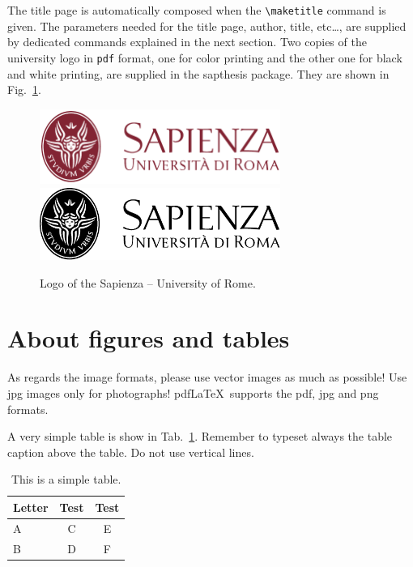 \documentclass[LaM,binding=0.6cm]{sapthesis}
\newcommand{\bs}{\textbackslash}
\begin{document}
The title page is automatically composed when the \texttt{\bs maketitle} command is given.
The parameters needed for the title page, author, title, etc\ldots , are supplied by dedicated commands explained in the next section.
Two copies of the university logo in \texttt{pdf} format, one for color printing and the other one for black and white printing, are supplied in the \textsf{sapthesis} package. They are shown in Fig.~\ref{fig:largenenough}.

\begin{figure}
\centering
\includegraphics[width=0.7\textwidth]{sapienza-MLred-pos}\\[3ex]
\includegraphics[width=0.7\textwidth]{sapienza-MLblack-pos}
\caption{Logo of the Sapienza -- University of Rome.}
\label{fig:largenenough}
\end{figure}



\section{About figures and tables}

As regards the image formats, please use vector images as much as possible! Use jpg images only for photographs! pdf\LaTeX\ supports the pdf, jpg and png formats.

A very simple table is show in Tab.~\ref{tab:letters}. Remember to typeset
always the table caption above the table. Do not use vertical lines.

\begin{table}
\caption{This is a simple table.}
\label{tab:letters}
\centering
\begin{tabular}{lcc}
\toprule
Letter & Test & Test \\
\midrule
A & C & E \\
B & D & F \\
\bottomrule
\end{tabular}
\end{table}
\end{document}
